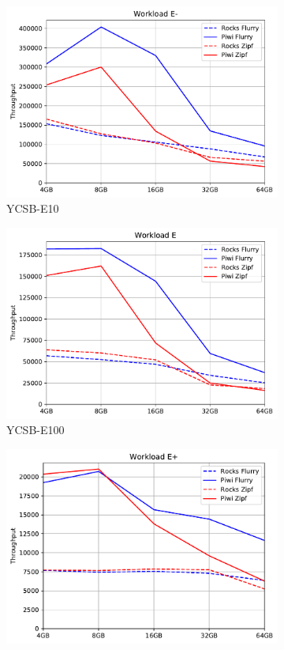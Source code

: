 \begin{figure}[tb]
\begin{subfigure}{0.3\linewidth}
\includegraphics[width=\textwidth]{figs/Workload_E-_line.pdf}
\caption{YCSB-E10}
\label{fig:throughput:e10}
\end{subfigure}
\begin{subfigure}{0.3\linewidth}
\includegraphics[width=\textwidth]{figs/Workload_E_line.pdf}
\caption{YCSB-E100}
\label{fig:throughput:e100}
\end{subfigure}
\begin{subfigure}{0.3\linewidth}
\includegraphics[width=\textwidth]{figs/Workload_E+_line.pdf}

\end{subfigure}
\end{figure}
